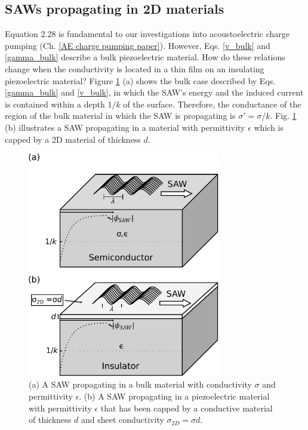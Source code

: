 \documentclass[double,12pt,1in]{beavtex}
\begin{document}
\subsection{SAWs propagating in 2D materials}

Equation 2.28 is fundamental to our investigations into acoustoelectric charge pumping
(Ch. \ref{AE charge pumping paper}). However, Eqs. \ref{v_bulk} and \ref{gamma_bulk} describe a bulk piezoelectric material. How do these relations change when the conductivity is located in a thin film on an insulating piezoelectric material? Figure \ref{SAW in thin film} (a) shows the bulk case described by Eqs. \ref{gamma_bulk} and \ref{v_bulk}, in which the SAW's energy and the induced current is contained within a depth $1/k$ of the surface. Therefore, the conductance of the region of the bulk material in which the SAW is propagating is $\sigma' = \sigma/k$. Fig. \ref{SAW in thin film} (b) illustrates a SAW propagating in a material with permittivity $\epsilon$ which is capped by a 2D material of thickness $d$. 

\begin{figure}
    \includegraphics[width = 0.75\textwidth]{SAW in thin film.pdf}
    \caption{(a) A SAW propagating in a bulk material with conductivity $\sigma$ and permittivity $\epsilon$. (b) A SAW propagating in a piezoelectric material with permittivity $\epsilon$ that has been capped by a conductive material of thickness $d$ and sheet conductivity $\sigma_{2D} = \sigma d$.}
    \label{SAW in thin film}
\end{figure}
\end{document}

